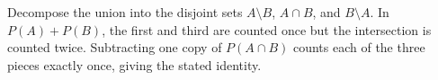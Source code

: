 Decompose the union into the disjoint sets $A\setminus B$, $A\cap B$, and $B\setminus A$. In $P(A)+P(B)$, the first and third are counted once but the intersection is counted twice. Subtracting one copy of $P(A\cap B)$ counts each of the three pieces exactly once, giving the stated identity.
